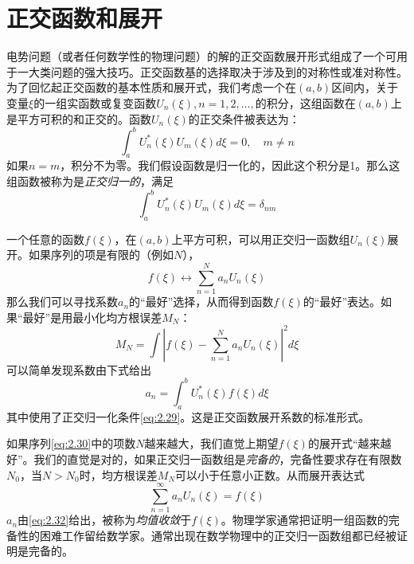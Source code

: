 \documentclass[12pt]{book}
\numberwithin{equation}{chapter}
\numberwithin{figure}{chapter}
\numberwithin{footnote}{page}
\begin{document}
\section{正交函数和展开}\label{sec:2.8}

电势问题（或者任何数学性的物理问题）的解的正交函数展开形式组成了一个可用于一大类问题的强大技巧。正交函数基的选择取决于涉及到的对称性或准对称性。为了回忆起正交函数的基本性质和展开式，我们考虑一个在$(a,b)$区间内，关于变量$\xi$的一组实函数或复变函数$U_n(\xi),n=1,2,\dots,$的积分，这组函数在$(a,b)$上是平方可积的和正交的。函数$U_n(\xi)$的正交条件被表达为：
\begin{equation}\label{eq:2.28}
    \int_a^b U_n^*(\xi)U_m(\xi)d\xi=0,\quad m\neq n
\end{equation}
如果$n=m$，积分不为零。我们假设函数是归一化的，因此这个积分是1。那么这组函数被称为是\textit{正交归一的}，满足
\begin{equation}\label{eq:2.29}
    \int_a^b U_n^*(\xi)U_m(\xi)d\xi=\delta_{nm}
\end{equation}

一个任意的函数$f(\xi)$，在$(a,b)$上平方可积，可以用正交归一函数组$U_n(\xi)$展开。如果序列的项是有限的（例如$N$），
\begin{equation}\label{eq:2.30}
    f(\xi)\leftrightarrow \sum_{n=1}^N a_nU_n(\xi)
\end{equation}
那么我们可以寻找系数$a_n$的“最好”选择，从而得到函数$f(\xi)$的“最好”表达。如果“最好”是用最小化均方根误差$M_N$：
\begin{equation}\label{eq:2.31}
    M_N=\int|f(\xi)-\sum_{n=1}^N a_n U_n(\xi)|^2 d\xi
\end{equation}
可以简单发现系数由下式给出
\begin{equation}\label{eq:2.32}
    a_n=\int_a^b U_n^*(\xi)f(\xi) d\xi
\end{equation}
其中使用了正交归一化条件\autoref{eq:2.29}。这是正交函数展开系数的标准形式。


如果序列\autoref{eq:2.30}中的项数$N$越来越大，我们直觉上期望$f(\xi)$的展开式“越来越好”。我们的直觉是对的，如果正交归一函数组是\textit{完备的}，完备性要求存在有限数$N_0$，当$N>N_0$时，均方根误差$M_N$可以小于任意小正数。从而展开表达式
\begin{equation}\label{eq:2.33}
    \sum_{n=1}^\infty a_n U_n(\xi)=f(\xi)
\end{equation}
$a_n$由\autoref{eq:2.32}给出，被称为\textit{均值收敛}于$f(\xi)$。物理学家通常把证明一组函数的完备性的困难工作留给数学家。通常出现在数学物理中的正交归一函数组都已经被证明是完备的。
\end{document}
